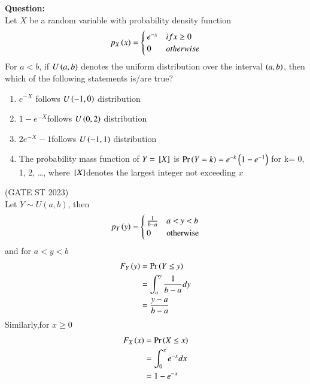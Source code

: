 \documentclass[book,11pt]{IEEEtran}
\begin{document}
\textbf{Question:}\\
Let $X$ be a random variable with probability density function
\begin{align}
p_{X}\left(x\right)=\begin{cases}
		e^{-x} & if x\ge 0\\ 
		0 & otherwise
	\end{cases}
\end{align}
For $a<b$, if $U\left(a,b\right)$ denotes the uniform distribution over the interval $\left(a,b\right)$,
then which of the following statements is/are true?
\begin{enumerate}[label=(\Alph*)]
\item $e^{-X}$ follows $U\left(-1,0\right)$ distribution
\item $1-e^{-X}$follows $U\left(0,2\right)$ distribution
\item $2e^{-X}-1$follows $U\left(-1,1\right)$ distribution
\item The probability mass function of $Y={}\left[X\right]$ is
$\Pr\left(Y=k\right)=e^{-k}\left(1-e^{-1}\right)$ for k= 0, 1, 2, …,
where ${}\left[X\right]$denotes the largest integer not exceeding $x$
\end{enumerate}
\hfill(GATE ST 2023)\\
\solution
\fi
Let $Y\sim U(a,b)$, then
\begin{align}
p_Y\left(y\right)=\begin{cases}
		\frac{1}{b-a} & a<y<b\\ 
		0 & \text{otherwise}
	\end{cases}
\end{align}
and for $a<y<b$ 
\begin{align}
F_Y\left(y\right)&=\Pr\left(Y \le y\right)\\
&=\int_{a}^{y}\frac{1}{b-a}dy\\
&=\frac{y-a}{b-a}
\end{align}
Similarly,for $x\ge 0$
\begin{align}
F_X\left(x\right)&=\Pr\left(X \le x\right)\\
&=\int_{0}^{x}e^{-x}dx\\
&=1-e^{-x}
\end{align}
\end{document}

